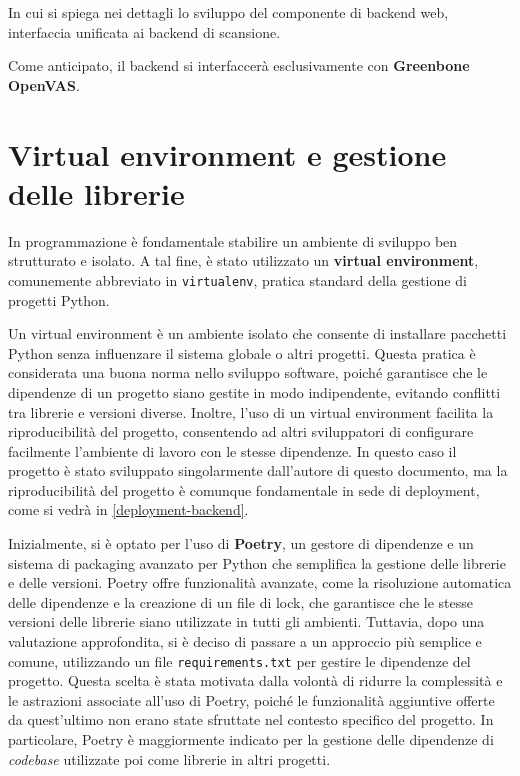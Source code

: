 In cui si spiega nei dettagli lo sviluppo del componente di backend web, interfaccia unificata ai backend di scansione.

Come anticipato, il backend si interfaccerà esclusivamente con \textbf{Greenbone OpenVAS}.

\section{Virtual environment e gestione delle librerie}
In programmazione è fondamentale stabilire un ambiente di sviluppo ben strutturato e isolato. A tal fine, è stato utilizzato un \textbf{virtual environment}, comunemente abbreviato in \texttt{virtualenv}, pratica standard della gestione di progetti Python.

Un virtual environment è un ambiente isolato che consente di installare pacchetti Python senza influenzare il sistema globale o altri progetti. Questa pratica è considerata una buona norma nello sviluppo software, poiché garantisce che le dipendenze di un progetto siano gestite in modo indipendente, evitando conflitti tra librerie e versioni diverse. Inoltre, l'uso di un virtual environment facilita la riproducibilità del progetto, consentendo ad altri sviluppatori di configurare facilmente l'ambiente di lavoro con le stesse dipendenze. In questo caso il progetto è stato sviluppato singolarmente dall'autore di questo documento, ma la riproducibilità del progetto è comunque fondamentale in sede di deployment, come si vedrà in \ref{deployment-backend}.

Inizialmente, si è optato per l'uso di \textbf{Poetry}, un gestore di dipendenze e un sistema di packaging avanzato per Python che semplifica la gestione delle librerie e delle versioni. Poetry offre funzionalità avanzate, come la risoluzione automatica delle dipendenze e la creazione di un file di lock, che garantisce che le stesse versioni delle librerie siano utilizzate in tutti gli ambienti. Tuttavia, dopo una valutazione approfondita, si è deciso di passare a un approccio più semplice e comune, utilizzando un file \texttt{requirements.txt} per gestire le dipendenze del progetto. Questa scelta è stata motivata dalla volontà di ridurre la complessità e le astrazioni associate all'uso di Poetry, poiché le funzionalità aggiuntive offerte da quest'ultimo non erano state sfruttate nel contesto specifico del progetto. In particolare, Poetry è maggiormente indicato per la gestione delle dipendenze di \emph{codebase} utilizzate poi come librerie in altri progetti.

